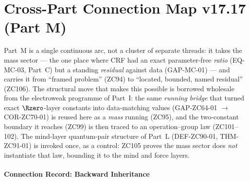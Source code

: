 \documentclass[12pt, a4paper]{article}
\begin{document}
\part{Cross-Part Connection Map v17.17 (Part M)}

\begin{conmapbox}[title={How Part M sits in the edition}]
\sloppy
Part~M is a single continuous arc, not a cluster of separate threads: it
takes the mass sector --- the one place where CRF had an exact
parameter-free \emph{ratio} (EQ-MC-03, Part~C) but a standing
\emph{residual} against data (GAP-MC-01) --- and carries it from
``framed problem'' (ZC94) to ``located, bounded, named residual'' (ZC106).
The structural move that makes this possible is borrowed wholesale from the
electroweak programme of Part~I: the same \emph{running bridge} that turned
exact $\Rzero$-layer constants into data-matching values
(GAP-ZC64-01 $\to$ COR-ZC70-01) is reused here as a \emph{mass} running
(ZC95), and the two-constant boundary it reaches (ZC99) is then traced to an
operation--group law (ZC101--102). The mind-layer quantum-pair structure of
Part~L (DEF-ZC90-01, THM-ZC91-01) is invoked once, as a control: ZC105 proves
the mass sector does \emph{not} instantiate that law, bounding it to the mind
and force layers.
\end{conmapbox}

\subsection{Connection Record: Backward Inheritance}
\end{document}
